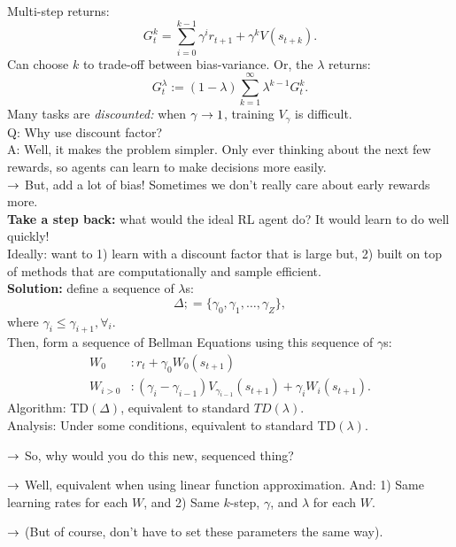 Multi-step returns:
\[
G_t^k = \sum_{i=0}^{k-1} \gamma^i r_{t+1} + \gamma^k V(s_{t+k}).
\]
Can choose $k$ to trade-off between bias-variance. Or, the $\lambda$ returns:
\[
G_t^\lambda := (1-\lambda) \sum_{k=1}^\infty \lambda^{k-1} G_t^k.
\]
Many tasks are {\it discounted:} when $\gamma \rightarrow 1$, training $V_\gamma$ is difficult. \\

Q: Why use discount factor?\\

A: Well, it makes the problem simpler. Only ever thinking about the next few rewards, so agents can learn to make decisions more easily.\\

$\rightarrow$ But, add a lot of bias! Sometimes we don't really care about early rewards more. \\

{\bf Take a step back:} what would the ideal RL agent do? It would learn to do well quickly! \\

Ideally: want to 1) learn with a discount factor that is large but, 2) built on top of methods that are computationally and sample efficient. \\

{\bf Solution:} define a sequence of $\lambda$s:
\[
\Delta ;= \{\gamma_0, \gamma_1, \ldots, \gamma_Z\},
\]
where $\gamma_i \leq \gamma_{i+1}, \forall_i$. \\

Then, form a sequence of Bellman Equations using this sequence of $\gamma$s:
\begin{align}
W_0 &: r_t + \gamma_0 W_0(s_{t+1}) \\
W_{i > 0} &: (\gamma_i - \gamma_{i-1})V_{\gamma_{i-1}}(s_{t+1}) + \gamma_i W_i(s_{t+1}).
\end{align}
Algorithm: TD$(\Delta)$, equivalent to standard $TD(\lambda)$. \\

Analysis: Under some conditions, equivalent to standard TD$(\lambda)$.
    
    $\rightarrow$ So, why would you do this new, sequenced thing?
    
    $\rightarrow$ Well, equivalent when using linear function approximation. And: 1) Same learning rates for each $W$, and 2) Same $k$-step, $\gamma$, and $\lambda$ for each $W$.
    
    $\rightarrow$ (But of course, don't have to set these parameters the same way). \\
    
